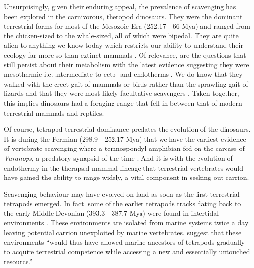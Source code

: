 \documentclass[a4paper,12pt]{article}
\begin{document}
Unsurprisingly, given their enduring appeal, the prevalence of scavenging has been explored in the carnivorous, theropod dinosaurs.
They were the dominant terrestrial forms for most of the Mesozoic Era (252.17 - 66 Mya) and ranged from the chicken-sized to the whale-sized, all of which were bipedal.
They are quite alien to anything we know today which restricts our ability to understand their ecology far more so than extinct mammals \citep{weishampel2004dinosauria}.
Of relevance, are the questions that still persist about their metabolism with the latest evidence suggesting they were mesothermic i.e. intermediate to ecto- and endotherms \citep{grady2014evidence}. 
We do know that they walked with the erect gait of mammals or birds rather than the sprawling gait of lizards and that they were most likely facultative scavengers \citep{weishampel2004dinosauria,depalma2013physical}. %
Taken together, this implies dinosaurs had a foraging range that fell in between that of modern terrestrial mammals and reptiles. 

Of course, tetrapod terrestrial dominance predates the evolution of the dinosaurs. %
It is during the Permian (298.9 - 252.17 Mya) %
that we have the earliest evidence of vertebrate scavenging where a temnospondyl amphibian fed on the carcass of \textit{Varanops}, a predatory synapsid of the time \citep{reisz2006articulated}. 
And it is with the evolution of endothermy in the therapsid-mammal lineage \citep{clarke2010temperature} that terrestrial vertebrates would have gained the ability to range widely, a vital component in seeking out carrion. 

Scavenging behaviour may have evolved on land as soon as the first terrestrial tetrapods emerged.
In fact, some of the earlier tetrapods tracks dating back to the early Middle Devonian (393.3 - 387.7 Mya) were found in intertidal environments \citep{Niedzwiedzki2009}.
These environments are isolated from marine systems twice a day leaving potential carrion unexploited by marine vertebrates.
\cite{Niedzwiedzki2009} suggest that these environments ``would thus have allowed marine ancestors of tetrapods gradually to acquire terrestrial competence while accessing a new and essentially untouched resource.''
\end{document}
